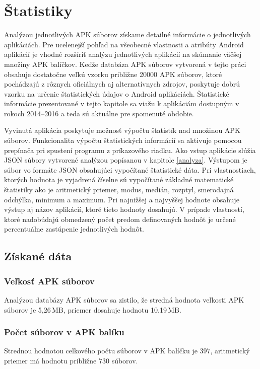 \chapter{Štatistiky}
\label{statistiky}
Analýzou jednotlivých APK súborov získame detailné informácie o jednotlivých aplikáciách. Pre ucelenejší pohľad na všeobecné vlastnosti a atribúty Android aplikácií je vhodné rozšíriť analýzu jednotlivých aplikácií na skúmanie väčšej množiny APK balíčkov. Keďže databáza APK súborov vytvorená v tejto práci obsahuje dostatočne veľkú vzorku približne 20000 APK súborov, ktoré pochádzajú z rôznych oficiálnych aj alternatívnych zdrojov, poskytuje dobrú vzorku na určenie štatistických údajov o Android aplikáciách. Štatistické informácie prezentované v tejto kapitole sa viažu k aplikáciám dostupným v rokoch 2014--2016 a teda sú aktuálne pre spomenuté obdobie.

Vyvinutá aplikácia  poskytuje možnosť výpočtu štatistík nad množinou APK súborov. Funkcionalita výpočtu štatistických informácií sa aktivuje pomocou prepínača  pri spustení programu z príkazového riadku. Ako vstup aplikácie slúžia JSON súbory vytvorené analýzou popísanou v kapitole \ref{analyza}. Výstupom je súbor vo formáte JSON obsahujúci vypočítané štatistické dáta. Pri vlastnostiach, ktorých hodnota je vyjadrená číselne sú vypočítané základné matematické štatistiky ako je aritmetický priemer, modus, medián, rozptyl, smerodajná odchýlka, minimum a maximum. Pri najnižšej a najvyššej hodnote obsahuje výstup aj názov aplikácií, ktoré tieto hodnoty dosahujú. V prípade vlastností, ktoré nadobúdajú obmedzený počet predom definovaných hodnôt je určené percentuálne zastúpenie jednotlivých hodnôt.

\section{Získané dáta}
\subsection*{Veľkosť APK súborov}
Analýzou databázy APK súborov sa zistilo, že stredná hodnota veľkosti APK súborov je 5,26\,MB, priemer dosahuje hodnotu 10.19\,MB.

\subsection*{Počet súborov v APK balíku}
Strednou hodnotou celkového počtu súborov v APK balíčku je 397, aritmetický priemer má hodnotu približne 730 súborov. 

